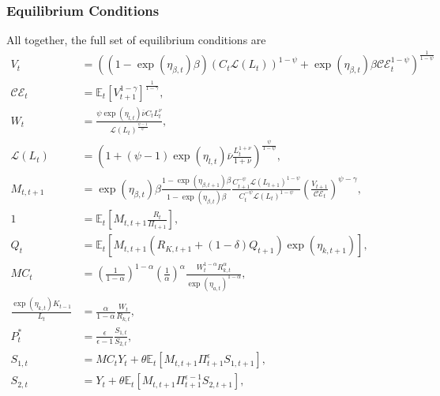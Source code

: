 \documentclass[12 pt, oneside]{article}
\theoremstyle{definition}
\theoremstyle{definition}
\theoremstyle{definition}
\newcommand{\E}{\mathbb{E}}
\newcommand{\calC}{\mathcal{C}}
\newcommand{\calE}{\mathcal{E}}
\newcommand{\calL}{\mathcal{L}}
\begin{document}
\subsubsection{Equilibrium Conditions}
All together, the full set of equilibrium conditions are
\begin{align}
  \label{eq:epstein zin recursion eqm}
  V_t & = \left((1 - \exp(\eta_{\beta, t})\beta )(C_t\calL(L_t))^{1 - \psi} + \exp(\eta_{\beta, t})\beta \calC\calE_t^{1 - \psi}\right)^{\frac{1}{1 - \psi}}\\
  \label{eq:certainty equivalent eqm}
  \calC\calE_t & = \E_t[V_{t + 1}^{1 - \gamma}]^{\frac{1}{1 - \gamma}},\\
  \label{eq:intratemporal consumption labor eqm}
  W_t & = \frac{\psi \exp(\eta_{l, t})\overline{\nu} C_t L_t^\nu}{\calL(L_t)^{\frac{\psi - 1}{\psi}}},\\
  \label{eq:labor disutility function eqm}
  \calL(L_t) & = \left(1 + (\psi - 1)\exp(\eta_{l, t})\overline{\nu}\frac{L_t^{1 + \nu}}{1 + \nu}\right)^{\frac{\psi}{1-\psi}},\\
  \label{eq:stochastic discount factor eqm}
  M_{t, t + 1} & = \exp(\eta_{\beta, t})\beta\frac{1 - \exp(\eta_{\beta, t + 1})\beta}{1 - \exp(\eta_{\beta, t})\beta}\frac{C_{t + 1}^{-\psi}\calL(L_{t + 1})^{1 - \psi}}{C_t^{-\psi}\calL(L_t)^{1 - \psi}}\left(\frac{V_{t + 1}}{\calC\calE_t}\right)^{\psi - \gamma},\\
  \label{eq:euler eqn eqm}
  1 & = \E_t\left[M_{t, t + 1}\frac{R_t}{\Pi_{t + 1}}\right],\\
  \label{eq:capital asset pricing eqm}
  Q_t & = \E_t\left[M_{t, t + 1} \left(R_{K, t + 1} + (1 - \delta)Q_{t + 1}\right)\exp(\eta_{k, t + 1})\right],\\
  \label{eq:mc soln eqm}
  MC_t & =  \left(\frac{1}{1 - \alpha}\right)^{1 - \alpha}\left(\frac{1}{\alpha}\right)^{\alpha}\frac{W_t^{1 - \alpha}R_{k, t}^{\alpha}}{ \exp(\eta_{a, t})^{1 - \alpha}},\\
  \label{eq:optimal capital labor ratio eqm}
  \frac{\exp(\eta_{k, t})K_{t - 1}}{L_t} & =\frac{\alpha}{1 - \alpha} \frac{W_t}{R_{k, t}},\\
  \label{eq:real optimal reset price eqm}
  P_t^* & = \frac{\epsilon}{\epsilon - 1}\frac{S_{1, t}}{S_{2, t}},\\
  \label{eq:numerator recursion eqm}
  S_{1, t} & = MC_t Y_t + \theta\E_t[M_{t, t + 1} \Pi_{t + 1}^\epsilon S_{1, t + 1}],\\
  \label{eq:denominator recursion eqm}
  S_{2, t} & =  Y_t + \theta\E_t[M_{t, t + 1} \Pi_{t + 1}^{\epsilon - 1} S_{2, t + 1}],\\

\end{align}
\end{document}
